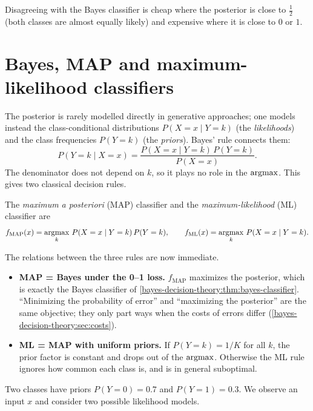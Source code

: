 \begin{notechapter}
Disagreeing with the Bayes classifier is cheap where the posterior is close to
$\frac12$ (both classes are almost equally likely) and expensive where it is
close to $0$ or $1$.

\section{Bayes, MAP and maximum-likelihood classifiers}\label{bayes-decision-theory:sec:map-ml}

The posterior is rarely modelled directly in generative approaches; one
models instead the class-conditional distributions $P(X = x \mid Y = k)$ (the
\emph{likelihoods}) and the class frequencies $P(Y = k)$ (the \emph{priors}).
Bayes' rule connects them:
\[
  P(Y = k \mid X = x) = \frac{P(X = x \mid Y = k)\, P(Y = k)}{P(X = x)} .
\]
The denominator does not depend on $k$, so it plays no role in the $\operatorname*{argmax}$.
This gives two classical decision rules.

\begin{definition}
The \emph{maximum a posteriori} (MAP) classifier and the \emph{maximum-likelihood}
(ML) classifier are
\[
  f_{\mathrm{MAP}}(x) = \operatorname*{argmax}_k\, P(X = x \mid Y = k)\,P(Y = k), \qquad
  f_{\mathrm{ML}}(x) = \operatorname*{argmax}_k\, P(X = x \mid Y = k).
\]
\end{definition}

The relations between the three rules are now immediate.
\begin{itemize}
  \item \textbf{MAP = Bayes under the 0--1 loss.} $f_{\mathrm{MAP}}$ maximizes
        the posterior, which is exactly the Bayes classifier of
        \cref{bayes-decision-theory:thm:bayes-classifier}. ``Minimizing the
        probability of error'' and ``maximizing the posterior'' are the same
        objective; they only part ways when the costs of errors differ
        (\cref{bayes-decision-theory:sec:costs}).
  \item \textbf{ML = MAP with uniform priors.} If $P(Y=k) = 1/K$ for all $k$,
        the prior factor is constant and drops out of the $\operatorname*{argmax}$. Otherwise
        the ML rule ignores how common each class is, and is in general
        suboptimal.
\end{itemize}

\begin{example}
Two classes have priors $P(Y=0) = 0.7$ and $P(Y=1) = 0.3$. We observe an input
$x$ and consider two possible likelihood models.


\end{example}
\end{notechapter}

